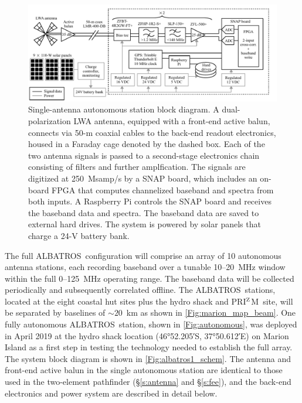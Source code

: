\documentclass{ws-jai}
\def\albatros{ALBATROS}
\def\prizm{PRI$^{\rm Z}$M}
\begin{document}
\begin{figure}
  \begin{center}
    \includegraphics[width=\linewidth]{Figures/albatros_single_schematic/albatros_single_schematic.pdf}
    \caption{Single-antenna autonomous station block diagram.  A
      dual-polarization LWA antenna, equipped with a front-end active
      balun, connects via 50-m coaxial cables to the back-end readout
      electronics, housed in a Faraday cage denoted by the dashed box.
      Each of the two antenna signals is passed to a second-stage
      electronics chain consisting of filters and further
      amplfication.  The signals are digitized at 250~Msamp/s by a
      SNAP board, which includes an on-board FPGA that computes
      channelized baseband and spectra from both inputs.  A Raspberry
      Pi controls the SNAP board and receives the baseband data and
      spectra.  The baseband data are saved to external hard drives.
      The system is powered by solar panels that charge a 24-V battery
      bank.}
    \label{Fig:albatros1_schem}
  \end{center}
\end{figure}

The full \albatros\ configuration will comprise an array of 10
autonomous antenna stations, each recording baseband over a tunable
10--20~MHz window within the full 0--125~MHz operating range.  The
baseband data will be collected periodically and subsequently
correlated offline.  The \albatros\ stations, located at the eight
coastal hut sites plus the hydro shack and \prizm\ site, will be
separated by baselines of $\sim20$~km as shown in
\autoref{Fig:marion_map_beam}. One fully autonomous \albatros\ station,
shown in \autoref{Fig:autonomous}, was deployed in April 2019 at the
hydro shack location (\ang{46;52.205;}S, \ang{37;50.612;}E) on Marion
Island as a first step in testing the technology needed to establish
the full array.  The system block diagram is shown in
\autoref{Fig:albatros1_schem}.  The antenna and front-end active balun
in the single autonomous station are identical to those used in the
two-element pathfinder (\S\ref{s:antenna} and \S\ref{s:fee}), and the
back-end electronics and power system are described in detail below.
\end{document}
